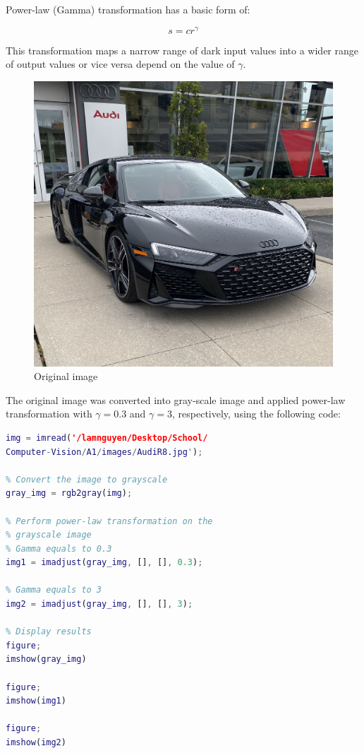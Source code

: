 \documentclass[conference]{IEEEtran}
\begin{document}
Power-law (Gamma) transformation has a basic form of: 

\[ s = c r^{\gamma} \]

This transformation maps a narrow range of dark input values into a wider range of output values or vice versa depend on the value of \(\gamma\).

\begin{figure}[h!]
\centering
\includegraphics[width=0.5\linewidth]{images/AudiR8.jpg}
\caption{Original image}
\label{fig:Audi R8}
\end{figure}

The original image was converted into gray-scale image and applied power-law transformation with \(\gamma = 0.3\) and \(\gamma = 3\), respectively, using the following code:

\begin{lstlisting}[language=Matlab]
% Load the original image
img = imread('/lamnguyen/Desktop/School/
Computer-Vision/A1/images/AudiR8.jpg');

% Convert the image to grayscale
gray_img = rgb2gray(img);

% Perform power-law transformation on the 
% grayscale image
% Gamma equals to 0.3 
img1 = imadjust(gray_img, [], [], 0.3);

% Gamma equals to 3
img2 = imadjust(gray_img, [], [], 3);

% Display results
figure;
imshow(gray_img)

figure;
imshow(img1)

figure;
imshow(img2)
\end{lstlisting}
\end{document}
